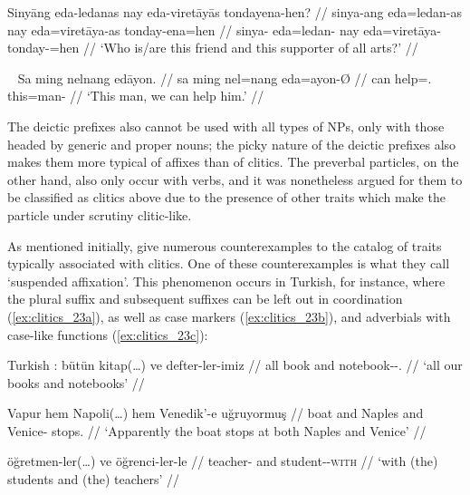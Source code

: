 \a\label{ex:clitics_21b}\begingl
	\gla Sinyāng eda-ledanas nay eda-viretāyās tondayena-hen? //
	\glb sinya-ang eda=ledan-as nay eda=viretāya-as tonday-ena=hen //
	\glc sinya-\Aarg{} eda=ledan-\Parg{} nay eda=viretāya-\Parg{} 
		tonday-\Gen{}=hen //
	\glft `Who is/are this friend and this supporter of all arts?' //
\endgl
\xe

\ex~\label{ex:clitics_22}\begingl
	\gla Sa ming nelnang edāyon. //
	\glb sa ming nel=nang eda=ayon-Ø //
	\glc \Parg{} can help=\Fpl{}.\Aarg{} this=man-\Top{} //
	\glft `This man, we can help him.' //
\endgl\xe

The deictic prefixes also cannot be used with all types of NPs, only with those
headed by generic and proper nouns; the picky nature of the deictic prefixes
also makes them more typical of affixes than of clitics. The preverbal
particles, on the other hand, also only occur with verbs, and it was
nonetheless argued for them to be classified as clitics above due to the
presence of other traits which make the particle under scrutiny clitic-like.

As mentioned initially, \citet{spencerluis2012} give numerous counterexamples
to the catalog of traits typically associated with clitics. One of these
counterexamples is what they call `suspended affixation'. This phenomenon
occurs in Turkish, for instance, where the plural suffix  and
subsequent suffixes can be left out in coordination (\ref{ex:clitics_23a}), as
well as case markers (\ref{ex:clitics_23b}), and adverbials with case-like
functions (\ref{ex:clitics_23c}):

\pex\label{ex:clitics_23}
Turkish \citep[199]{spencerluis2012}:
\a\label{ex:clitics_23a}\begingl
	\gla bütün kitap(…) ve defter-ler-imiz //
	\glb all book and notebook-\Pl{}-\Fpl{}.\Poss{} //
	\glft `all our books and notebooks' //
\endgl

\a\label{ex:clitics_23b}\begingl
	\gla Vapur hem Napoli(…) hem Venedik'-e uğruyormuş //
	\glb boat and Naples and Venice-\Loc{} stops.\Evid{} //
	\glft `Apparently the boat stops at both Naples and Venice' //
\endgl

\a\label{ex:clitics_23c}\begingl
	\gla öğretmen-ler(…) ve öğrenci-ler-le //
	\glb teacher-\Pl{} and student-\Pl{}-\textsc{with} //
	\glft `with (the) students and (the) teachers' //
\endgl
\xe

